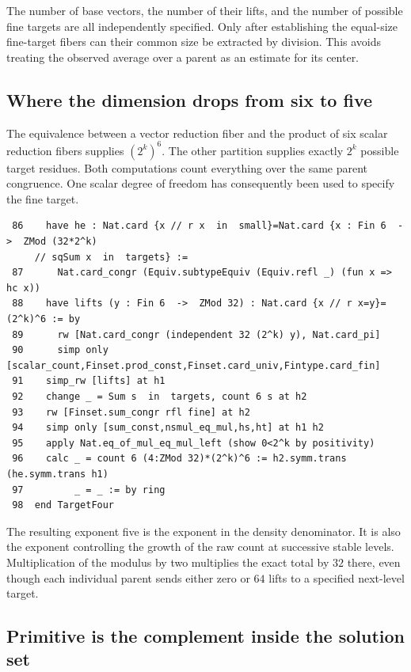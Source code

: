 \documentclass[12pt,letterpaper]{article}
\begin{document}
The number of base vectors, the number of their lifts, and the number of possible fine targets are all independently specified. Only after establishing the equal-size fine-target fibers can their common size be extracted by division. This avoids treating the observed average over a parent as an estimate for its center.
\clearpage{}\subsection*{Where the dimension drops from six to five}\label{extract-FourLift86}
The equivalence between a vector reduction fiber and the product of six scalar reduction fibers supplies $(2^k)^6$. The other partition supplies exactly $2^k$ possible target residues. Both computations count everything over the same parent congruence. One scalar degree of freedom has consequently been used to specify the fine target.
\par
{\fontsize{9.2}{11.2}\selectfont\begin{verbatim}
 86    have he : Nat.card {x // r x  in  small}=Nat.card {x : Fin 6  ->  ZMod (32*2^k)
     // sqSum x  in  targets} :=
 87      Nat.card_congr (Equiv.subtypeEquiv (Equiv.refl _) (fun x => hc x))
 88    have lifts (y : Fin 6  ->  ZMod 32) : Nat.card {x // r x=y}=(2^k)^6 := by
 89      rw [Nat.card_congr (independent 32 (2^k) y), Nat.card_pi]
 90      simp only [scalar_count,Finset.prod_const,Finset.card_univ,Fintype.card_fin]
 91    simp_rw [lifts] at h1
 92    change _ = Sum s  in  targets, count 6 s at h2
 93    rw [Finset.sum_congr rfl fine] at h2
 94    simp only [sum_const,nsmul_eq_mul,hs,ht] at h1 h2
 95    apply Nat.eq_of_mul_eq_mul_left (show 0<2^k by positivity)
 96    calc _ = count 6 (4:ZMod 32)*(2^k)^6 := h2.symm.trans (he.symm.trans h1)
 97         _ = _ := by ring
 98  end TargetFour
\end{verbatim}}
The resulting exponent five is the exponent in the density denominator. It is also the exponent controlling the growth of the raw count at successive stable levels. Multiplication of the modulus by two multiplies the exact total by $32$ there, even though each individual parent sends either zero or $64$ lifts to a specified next-level target.
\clearpage{}\subsection*{Primitive is the complement inside the solution set}\label{extract-FourEven5}
\end{document}
